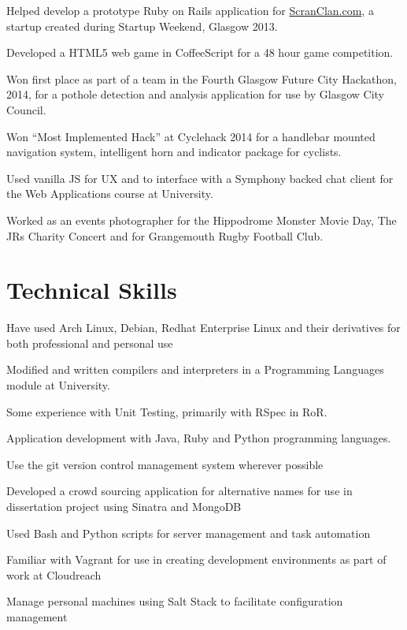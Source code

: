\documentclass[11pt,a4paper]{article}
\renewenvironment{itemize}{
  \begin{list}{}{
    \setlength{\leftmargin}{1em}
    \setlength{\itemsep}{0.25em}
    \setlength{\parskip}{0pt}
    \setlength{\parsep}{0.25em}
    \renewcommand{\labelitemi}{$\bullet$}
  }
}{
  \end{list}
}
\begin{document}
\begin{itemize}
    \item Helped develop a prototype Ruby on Rails application for \href{http://www.ScranClan.com}{ScranClan.com}, a startup created during Startup Weekend, Glasgow 2013.
    \item Developed a HTML5 web game in CoffeeScript for a 48 hour game
        competition.
    \item Won first place as part of a team in the Fourth Glasgow Future City Hackathon, 2014, for a pothole detection and analysis application for use by Glasgow City Council.
    \item Won ``Most Implemented Hack'' at Cyclehack 2014 for a handlebar mounted navigation system, intelligent horn and indicator package for cyclists.
    \item Used vanilla JS for UX and to interface with a Symphony backed chat client for the Web Applications course at University.
    \item Worked as an events photographer for the Hippodrome Monster Movie Day, The JRs Charity Concert and for Grangemouth Rugby Football Club.
\end{itemize}

\section*{Technical Skills}


\begin{itemize}
    \item Have used Arch Linux, Debian, Redhat Enterprise Linux and their derivatives for both professional and personal use
    \item Modified and written compilers and interpreters in a Programming Languages module at University.
    \item Some experience with Unit Testing, primarily with RSpec in RoR.
    \item Application development with Java, Ruby and Python programming languages.
    \item Use the git version control management system wherever possible
    \item Developed a crowd sourcing application for alternative names for use in dissertation project using Sinatra and MongoDB
    \item Used Bash and Python scripts for server management and task automation
    \item Familiar with Vagrant for use in creating development environments as part of work at Cloudreach
    \item Manage personal machines using Salt Stack to facilitate configuration management
\end{itemize}
\end{document}
